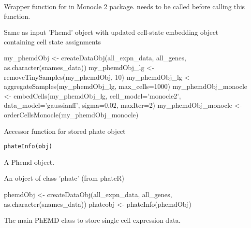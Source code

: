 \documentclass[a4paper]{book}
\begin{document}
%
\begin{Details}\relax
Wrapper function for  in Monocle 2 package.  needs to be called before calling this function.
\end{Details}
%
\begin{Value}
Same as input 'Phemd' object with updated cell-state embedding object containing cell state assignments
\end{Value}
%
\begin{Examples}
\begin{ExampleCode}

my_phemdObj <- createDataObj(all_expn_data, all_genes, as.character(snames_data))
my_phemdObj_lg <- removeTinySamples(my_phemdObj, 10)
my_phemdObj_lg <- aggregateSamples(my_phemdObj_lg, max_cells=1000)
my_phemdObj_monocle <- embedCells(my_phemdObj_lg, cell_model='monocle2', data_model='gaussianff', sigma=0.02, maxIter=2)
my_phemdObj_monocle <- orderCellsMonocle(my_phemdObj_monocle)
\end{ExampleCode}
\end{Examples}
%
\begin{Description}\relax
Accessor function for stored phate object
\end{Description}
%
\begin{Usage}
\begin{verbatim}
phateInfo(obj)
\end{verbatim}
\end{Usage}
%
\begin{Arguments}
\begin{ldescription}
\item[\code{obj}] A Phemd object.
\end{ldescription}
\end{Arguments}
%
\begin{Value}
An object of class 'phate' (from phateR)
\end{Value}
%
\begin{Examples}
\begin{ExampleCode}
phemdObj <- createDataObj(all_expn_data, all_genes, as.character(snames_data))
phateobj <- phateInfo(phemdObj)

\end{ExampleCode}
\end{Examples}
%
\begin{Description}\relax
The main PhEMD class to store single-cell expression data.
\end{Description}
\end{document}
